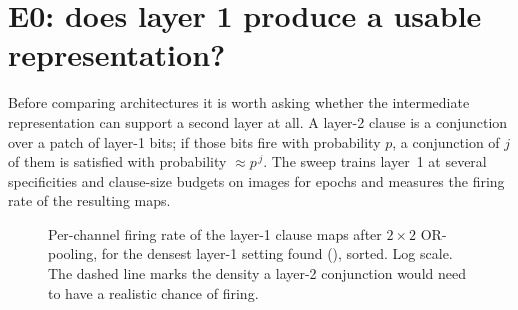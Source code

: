 \section{E0: does layer 1 produce a usable representation?}
\label{sec:density}

Before comparing architectures it is worth asking whether the intermediate representation
can support a second layer at all. A layer-2 clause is a conjunction over a patch of layer-1
bits; if those bits fire with probability $p$, a conjunction of $j$ of them is satisfied with
probability $\approx p^{\,j}$. The sweep trains layer~1 at several specificities and
clause-size budgets on \densitySubset{} images for \densityEpochs{} epochs and measures the
firing rate of the resulting maps.

\begin{table}[h]
\centering\small
\caption{Layer-1 clause density against specificity.  is the median per-channel
firing rate at OR-pool $1$, $2$ and $4$;  is the fraction of channels that never
fire. Rows with a clause-size budget $b$ are diagnostics of the budget mechanism
(\S\ref{sec:budgetbug}); the sequential row trains on a tenth of the data, so its accuracy is
not comparable.}
\label{tab:density}
\end{table}

\begin{figure}[h]
\centering
{}
\caption{Per-channel firing rate of the layer-1 clause maps after $2\times2$ OR-pooling, for
the densest layer-1 setting found (\densityDensestLabel{}), sorted. Log scale. The dashed
line marks the density a layer-2 conjunction would need to have a realistic chance of firing.}
\label{fig:firing}
\end{figure}

